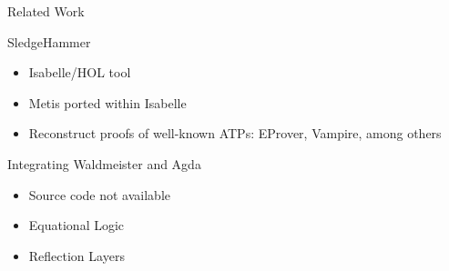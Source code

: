 \documentclass[xetex, hyperref={pdfpagelabels=false}]{beamer}
\begin{document}
\begin{frame}[fragile, label=after-reconstruction]
\end{frame}

\begin{frame}[fragile, label=hammer]{Related Work}
\begin{block}{SledgeHammer}
\begin{itemize}
\item Isabelle/HOL tool
\item Metis ported within Isabelle
\item Reconstruct proofs of well-known ATPs: EProver, Vampire, among others
\end{itemize}
\end{block}

\begin{block}{Integrating Waldmeister and Agda}
\begin{itemize}
  \item Source code not available
  \item Equational Logic
  \item Reflection Layers
  \end{itemize}
\end{block}
\end{frame}
\end{document}
